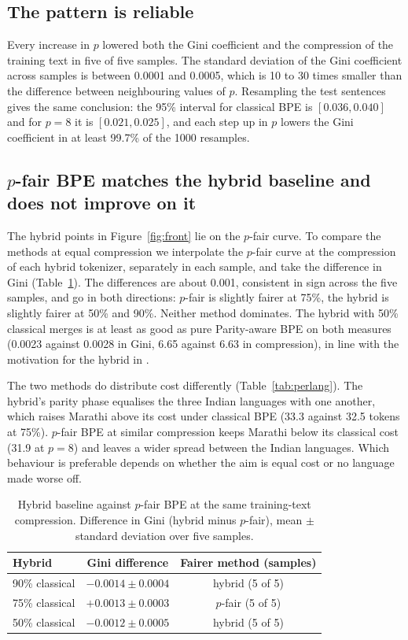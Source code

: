 \documentclass[11pt,a4paper]{article}
\theoremstyle{remark}
\begin{document}
\subsection{The pattern is reliable}

Every increase in $p$ lowered both the Gini coefficient and the compression of the training
text in five of five samples. The standard deviation of the Gini coefficient across samples
is between 0.0001 and 0.0005, which is 10 to 30 times smaller than the difference between
neighbouring values of $p$. Resampling the test sentences gives the same conclusion: the
95\% interval for classical BPE is $[0.036,0.040]$ and for $p=8$ it is $[0.021,0.025]$, and
each step up in $p$ lowers the Gini coefficient in at least 99.7\% of the 1000 resamples.

\subsection{$p$-fair BPE matches the hybrid baseline and does not improve on it}

The hybrid points in Figure~\ref{fig:front} lie on the $p$-fair curve. To compare the
methods at equal compression we interpolate the $p$-fair curve at the compression of each
hybrid tokenizer, separately in each sample, and take the difference in Gini
(Table~\ref{tab:hybrid}). The differences are about 0.001, consistent in sign across the five
samples, and go in both directions: $p$-fair is slightly fairer at 75\%, the hybrid is
slightly fairer at 50\% and 90\%. Neither method dominates. The hybrid with 50\% classical
merges is at least as good as pure Parity-aware BPE on both measures (0.0023 against 0.0028
in Gini, 6.65 against 6.63 in compression), in line with the motivation for the hybrid
in \cite{foroutan2026}.

The two methods do distribute cost differently (Table~\ref{tab:perlang}). The hybrid's
parity phase equalises the three Indian languages with one another, which raises Marathi
above its cost under classical BPE (33.3 against 32.5 tokens at 75\%). $p$-fair BPE at
similar compression keeps Marathi below its classical cost (31.9 at $p=8$) and leaves a
wider spread between the Indian languages. Which behaviour is preferable depends on whether
the aim is equal cost or no language made worse off.

\begin{table}[t]
\centering
\caption{Hybrid baseline against $p$-fair BPE at the same training-text compression.
Difference in Gini (hybrid minus $p$-fair), mean $\pm$ standard deviation over five samples.}
\label{tab:hybrid}
\begin{tabular}{lcc}
\toprule
Hybrid & Gini difference & Fairer method (samples)\\
\midrule
90\% classical & $-0.0014\pm0.0004$ & hybrid (5 of 5)\\
75\% classical & $+0.0013\pm0.0003$ & $p$-fair (5 of 5)\\
50\% classical & $-0.0012\pm0.0005$ & hybrid (5 of 5)\\
\bottomrule
\end{tabular}
\end{table}
\end{document}
